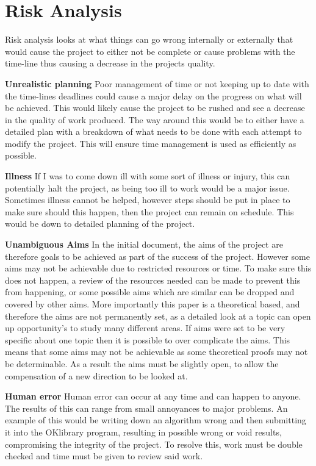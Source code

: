 \documentclass[11pt,a4paper, notitlepage]{report}
\begin{document}
\section{Risk Analysis}
\label{sec:RiskAnalysis}
Risk analysis looks at what things can go wrong internally or externally that would cause the project to either not be complete or cause problems with the time-line thus causing a decrease in the projects quality.


\textbf{Unrealistic planning}
Poor management of time or not keeping up to date with the time-lines deadlines could cause a major delay on the progress on what will be achieved. This would likely cause the project to be rushed and see a decrease in the quality of work produced. The way around this would be to either have a detailed plan with a breakdown of what needs to be done with each attempt to modify the project. This will ensure time management is used as efficiently as possible.

\textbf{Illness}
If I was to come down ill with some sort of illness or injury, this can potentially halt the project, as being too ill to work would be a major issue. Sometimes illness cannot be helped, however steps should be put in place to make sure should this happen, then the project can remain on schedule. This would be down to detailed planning of the project.


\textbf{Unambiguous Aims}
In the initial document, the aims of the project are therefore goals to be achieved as part of the success of the project. However some aims may not be achievable due to restricted resources or time.
To make sure this does not happen, a review of the resources needed can be made to prevent this from happening, or some possible aims which are similar can be dropped and covered by other aims. More importantly this paper is a theoretical based, and therefore the aims are not permanently set, as a detailed look at a topic can open up opportunity's to study many different areas. If aims were set to be very specific about one topic then it is possible to over complicate the aims. This means that some aims may not be achievable as some theoretical proofs may not be determinable. As a result the aims must be slightly open, to allow the compensation of a new direction to be looked at.


\textbf{Human error}
Human error can occur at any time and can happen to anyone. The results of this can range from small annoyances to major problems. An example of this would be writing down an algorithm wrong and then submitting it into the OKlibrary program, resulting in possible wrong or void results, compromising the integrity of the project. To resolve this, work must be double checked and time must be given to review said work.
\end{document}
